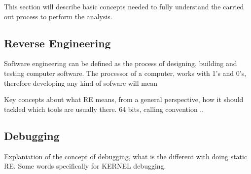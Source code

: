 This section will describe basic concepts needed to fully understand the carried out process to perform the analysis. 
\subsection{Reverse Engineering}
Software engineering can be defined as the process of designing, building and testing computer software. The processor of a computer, works with 1's and 0's, therefore developing any kind of sofware will mean 

Key concepts about what RE means, from a general perspective, how it should tackled which tools are usually there.  64 bits, calling convention .. 
\subsection{Debugging}
Explaniation of the concept of debugging, what is the different with doing static RE. Some words specifically for KERNEL debugging. 

